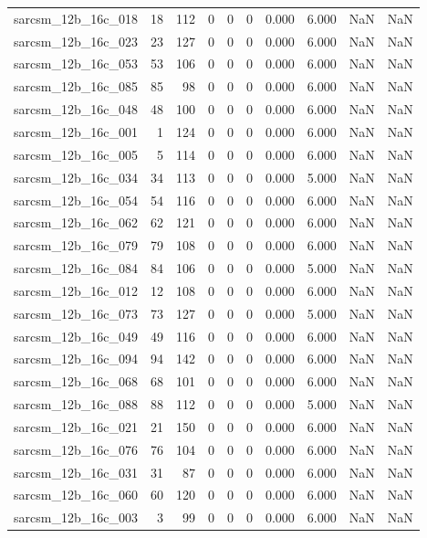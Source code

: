 \documentclass{article}
\begin{document}
\begin{longtable}{lrrrrrrrrr}
sarcsm\_12b\_16c\_018 & 18 & 112 & 0 & 0 & 0 & 0.000 & 6.000 & NaN & NaN \\
sarcsm\_12b\_16c\_023 & 23 & 127 & 0 & 0 & 0 & 0.000 & 6.000 & NaN & NaN \\
sarcsm\_12b\_16c\_053 & 53 & 106 & 0 & 0 & 0 & 0.000 & 6.000 & NaN & NaN \\
sarcsm\_12b\_16c\_085 & 85 & 98 & 0 & 0 & 0 & 0.000 & 6.000 & NaN & NaN \\
sarcsm\_12b\_16c\_048 & 48 & 100 & 0 & 0 & 0 & 0.000 & 6.000 & NaN & NaN \\
sarcsm\_12b\_16c\_001 & 1 & 124 & 0 & 0 & 0 & 0.000 & 6.000 & NaN & NaN \\
sarcsm\_12b\_16c\_005 & 5 & 114 & 0 & 0 & 0 & 0.000 & 6.000 & NaN & NaN \\
sarcsm\_12b\_16c\_034 & 34 & 113 & 0 & 0 & 0 & 0.000 & 5.000 & NaN & NaN \\
sarcsm\_12b\_16c\_054 & 54 & 116 & 0 & 0 & 0 & 0.000 & 6.000 & NaN & NaN \\
sarcsm\_12b\_16c\_062 & 62 & 121 & 0 & 0 & 0 & 0.000 & 6.000 & NaN & NaN \\
sarcsm\_12b\_16c\_079 & 79 & 108 & 0 & 0 & 0 & 0.000 & 6.000 & NaN & NaN \\
sarcsm\_12b\_16c\_084 & 84 & 106 & 0 & 0 & 0 & 0.000 & 5.000 & NaN & NaN \\
sarcsm\_12b\_16c\_012 & 12 & 108 & 0 & 0 & 0 & 0.000 & 6.000 & NaN & NaN \\
sarcsm\_12b\_16c\_073 & 73 & 127 & 0 & 0 & 0 & 0.000 & 5.000 & NaN & NaN \\
sarcsm\_12b\_16c\_049 & 49 & 116 & 0 & 0 & 0 & 0.000 & 6.000 & NaN & NaN \\
sarcsm\_12b\_16c\_094 & 94 & 142 & 0 & 0 & 0 & 0.000 & 6.000 & NaN & NaN \\
sarcsm\_12b\_16c\_068 & 68 & 101 & 0 & 0 & 0 & 0.000 & 6.000 & NaN & NaN \\
sarcsm\_12b\_16c\_088 & 88 & 112 & 0 & 0 & 0 & 0.000 & 5.000 & NaN & NaN \\
sarcsm\_12b\_16c\_021 & 21 & 150 & 0 & 0 & 0 & 0.000 & 6.000 & NaN & NaN \\
sarcsm\_12b\_16c\_076 & 76 & 104 & 0 & 0 & 0 & 0.000 & 6.000 & NaN & NaN \\
sarcsm\_12b\_16c\_031 & 31 & 87 & 0 & 0 & 0 & 0.000 & 6.000 & NaN & NaN \\
sarcsm\_12b\_16c\_060 & 60 & 120 & 0 & 0 & 0 & 0.000 & 6.000 & NaN & NaN \\
sarcsm\_12b\_16c\_003 & 3 & 99 & 0 & 0 & 0 & 0.000 & 6.000 & NaN & NaN \\

\end{longtable}
\end{document}
